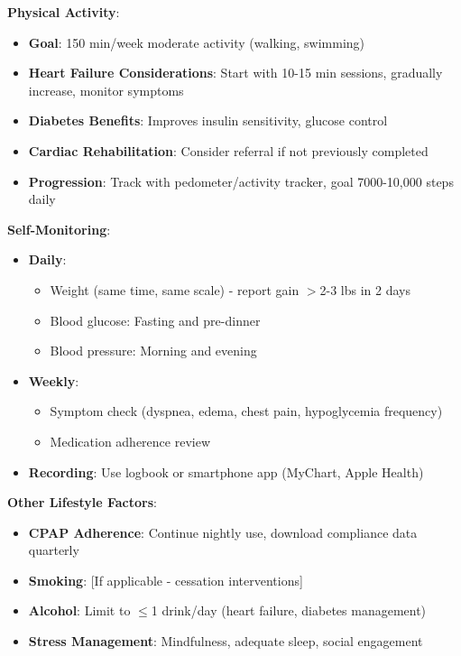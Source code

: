 \documentclass[11pt,letterpaper]{article}
\begin{document}
\textbf{Physical Activity}:
\begin{itemize}[leftmargin=*]
    \item \textbf{Goal}: 150 min/week moderate activity (walking, swimming)
    \item \textbf{Heart Failure Considerations}: Start with 10-15 min sessions, gradually increase, monitor symptoms
    \item \textbf{Diabetes Benefits}: Improves insulin sensitivity, glucose control
    \item \textbf{Cardiac Rehabilitation}: Consider referral if not previously completed
    \item \textbf{Progression}: Track with pedometer/activity tracker, goal 7000-10,000 steps daily
\end{itemize}

\textbf{Self-Monitoring}:
\begin{itemize}[leftmargin=*]
    \item \textbf{Daily}:
    \begin{itemize}
        \item Weight (same time, same scale) - report gain $>$2-3 lbs in 2 days
        \item Blood glucose: Fasting and pre-dinner
        \item Blood pressure: Morning and evening
    \end{itemize}
    \item \textbf{Weekly}:
    \begin{itemize}
        \item Symptom check (dyspnea, edema, chest pain, hypoglycemia frequency)
        \item Medication adherence review
    \end{itemize}
    \item \textbf{Recording}: Use logbook or smartphone app (MyChart, Apple Health)
\end{itemize}

\textbf{Other Lifestyle Factors}:
\begin{itemize}[leftmargin=*]
    \item \textbf{CPAP Adherence}: Continue nightly use, download compliance data quarterly
    \item \textbf{Smoking}: [If applicable - cessation interventions]
    \item \textbf{Alcohol}: Limit to $\leq$1 drink/day (heart failure, diabetes management)
    \item \textbf{Stress Management}: Mindfulness, adequate sleep, social engagement
\end{itemize}
\end{document}
